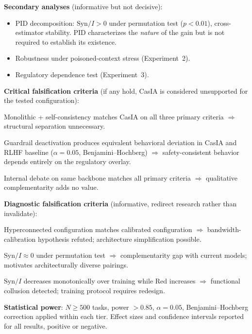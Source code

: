 \documentclass[11pt,a4paper]{article}
\theoremstyle{definition}
\begin{document}
\textbf{Secondary analyses} (informative but not decisive):
\begin{itemize}[leftmargin=*,itemsep=2pt]
\item PID decomposition: $\mathrm{Syn}/I > 0$ under permutation test ($p < 0.01$), cross-estimator stability. PID characterizes the \emph{nature} of the gain but is not required to establish its existence.
\item Robustness under poisoned-context stress (Experiment~2).
\item Regulatory dependence test (Experiment~3).
\end{itemize}

\textbf{Critical falsification criteria} (if any hold, CasIA is considered unsupported for the tested configuration):
\begin{description}[leftmargin=*,itemsep=3pt]
\item[F1] Monolithic + self-consistency matches CasIA on all three primary criteria $\Rightarrow$ structural separation unnecessary.
\item[F3] Guardrail deactivation produces equivalent behavioral deviation in CasIA and RLHF baseline ($\alpha=0.05$, Benjamini--Hochberg) $\Rightarrow$ safety-consistent behavior depends entirely on the regulatory overlay.
\item[F5] Internal debate on same backbone matches all primary criteria $\Rightarrow$ qualitative complementarity adds no value.
\end{description}

\textbf{Diagnostic falsification criteria} (informative, redirect research rather than invalidate):
\begin{description}[leftmargin=*,itemsep=3pt]
\item[F2] Hyperconnected configuration matches calibrated configuration $\Rightarrow$ bandwidth-calibration hypothesis refuted; architecture simplification possible.
\item[F4] $\mathrm{Syn}/I \approx 0$ under permutation test $\Rightarrow$ complementarity gap with current models; motivates architecturally diverse pairings.
\item[F6] $\mathrm{Syn}/I$ decreases monotonically over training while $\mathrm{Red}$ increases $\Rightarrow$ functional collusion detected; training protocol requires redesign.
\end{description}

\textbf{Statistical power}: $N \geq 500$ tasks, power $> 0.85$, $\alpha = 0.05$, Benjamini--Hochberg correction applied within each tier. Effect sizes and confidence intervals reported for all results, positive or negative.
\end{document}
